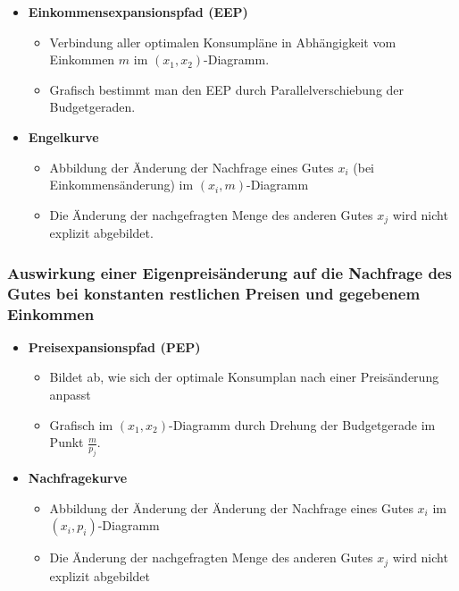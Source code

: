 \begin{itemize}
	\item \textbf{Einkommensexpansionspfad (EEP)}
		\begin{itemize}
			\item Verbindung aller optimalen Konsumpläne in Abhängigkeit vom Einkommen $m$ im $(x_1, x_2)$-Diagramm.
			\item Grafisch bestimmt man den EEP durch Parallelverschiebung der Budgetgeraden.
		\end{itemize} %
	\item \textbf{Engelkurve}
		\begin{itemize}
			\item Abbildung der Änderung der Nachfrage eines Gutes $x_i$ (bei Einkommensänderung) im $(x_i, m)$-Diagramm
			\item Die Änderung der nachgefragten Menge des anderen Gutes $x_j$ wird nicht explizit abgebildet.
		\end{itemize} %
\end{itemize}

\subsubsection*{Auswirkung einer Eigenpreisänderung auf die Nachfrage des Gutes bei konstanten restlichen Preisen und gegebenem Einkommen}

\begin{itemize} \setcounter{enumi}{2}
	\item \textbf{Preisexpansionspfad (PEP)}
		\begin{itemize}
			\item Bildet ab, wie sich der optimale Konsumplan nach einer Preisänderung anpasst
			\item Grafisch im $(x_1, x_2)$-Diagramm durch Drehung der Budgetgerade im Punkt $\frac{m}{p_j}$.
		\end{itemize}
	\item \textbf{Nachfragekurve}
		\begin{itemize}
			\item Abbildung der Änderung der Änderung der Nachfrage eines Gutes $x_i$ im $(x_i, p_i)$-Diagramm
			\item Die Änderung der nachgefragten Menge des anderen Gutes $x_j$ wird nicht explizit abgebildet
		\end{itemize}	
\end{itemize}

